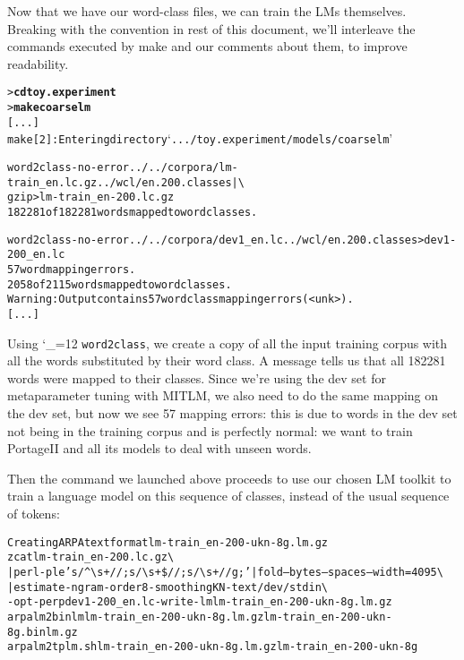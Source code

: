 \documentclass[11pt,letterpaper]{article}
\newcommand{\bs}{\textbackslash{}}
\newcommand{\PS}{PortageII\xspace}
\def\code{\begingroup\catcode`\_=12 \codex}
\newcommand{\codex}[1]{\texttt{#1}\endgroup}
\begin{document}
Now that we have our word-class files, we can train the LMs themselves.
Breaking with the convention in rest of this document, we'll
interleave the commands executed by make and our comments about them, to
improve readability.

\begin{small}
\begin{alltt}
   > \textbf{cd toy.experiment}
   > \textbf{make coarselm}
   [...]
   make[2]: Entering directory `.../toy.experiment/models/coarselm'

   word2class -no-error ../../corpora/lm-train_en.lc.gz ../wcl/en.200.classes | \bs
      gzip > lm-train_en-200.lc.gz
   182281 of 182281 words mapped to word classes.

   word2class -no-error ../../corpora/dev1_en.lc ../wcl/en.200.classes > dev1-200_en.lc
   57 word mapping errors.
   2058 of 2115 words mapped to word classes.
   Warning: Output contains 57 word class mapping errors (<unk>).
   [...]
\end{alltt}
\end{small}

Using \code{word2class}, we create a copy of all the input training corpus with
all the words substituted by their word class. A message tells us that all
182281 words were mapped to their classes. Since we're using the dev set for
metaparameter tuning with MITLM, we also need to do the same mapping on the dev
set, but now we see 57 mapping errors: this is due to words in the dev set not
being in the training corpus and is perfectly normal: we want to train \PS and
all its models to deal with unseen words.

Then the command we launched above proceeds to use our chosen LM toolkit to
train a language model on this sequence of classes, instead of the usual
sequence of tokens:
\begin{small}
\begin{alltt}
   Creating ARPA text format lm-train_en-200-ukn-8g.lm.gz
   zcat lm-train_en-200.lc.gz \bs
      | perl -ple 's/^{\bs}s+//; s/{\bs}s+\$//; s/{\bs}s+/ /g;' | fold --bytes --spaces --width=4095 \bs
      | estimate-ngram -order 8 -smoothing KN -text /dev/stdin \bs
           -opt-perp dev1-200_en.lc -write-lm lm-train_en-200-ukn-8g.lm.gz
   arpalm2binlm lm-train_en-200-ukn-8g.lm.gz lm-train_en-200-ukn-8g.binlm.gz
   arpalm2tplm.sh lm-train_en-200-ukn-8g.lm.gz lm-train_en-200-ukn-8g
\end{alltt}
\end{small}
\end{document}
